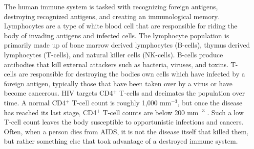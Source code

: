 \documentclass[letterpaper, 11 pt, conference]{ieeeconf}
\begin{document}
The human immune system is tasked with recognizing foreign antigens, destroying recognized antigens, and creating an immunological memory. Lymphocytes are a type of white blood cell that are responsible for riding the body of invading antigens and infected cells. The lymphocyte population is primarily made up of bone marrow derived lymphocytes (B-cells), thymus derived lymphocytes (T-cells), and natural killer cells (NK-cells). B-cells produce antibodies that kill external attackers such as bacteria, viruses, and toxins. T-cells are responsible for destroying the bodies own cells which have infected by a foreign antigen, typically those that have been taken over by a virus or have become cancerous. HIV targets CD4$^{+}$ T-cells and decimates the population over time. A normal CD4$^{+}$ T-cell count is roughly 1,000 mm$^{-3}$, but once the disease has reached its last stage, CD4$^{+}$ T-cell counts are below 200 mm$^{-3}$ \cite{perelson1999}. Such a low T-cell count leaves the body susceptible to opportunistic infections and cancers. Often, when a person dies from AIDS, it is not the disease itself that killed them, but rather something else that took advantage of a destroyed immune system. 
\end{document}
